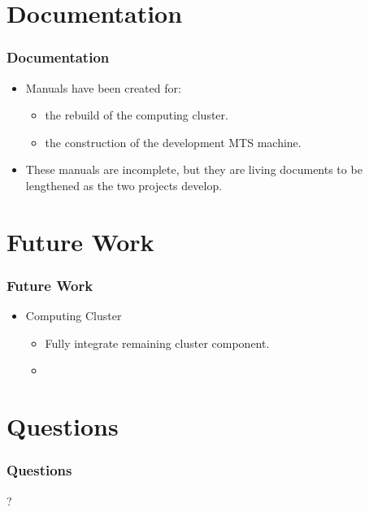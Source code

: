 \documentclass[aspectratio=169]{beamer}
\begin{document}


\section{Documentation}

\begin{frame}

  \frametitle{Documentation}

  \begin{itemize}
    \item Manuals have been created for:
      \begin{itemize}
        \item the rebuild of the computing cluster.
        \item the construction of the development MTS machine.
      \end{itemize}
    \item These manuals are incomplete, but they are living documents to be
      lengthened as the two projects develop.
  \end{itemize}


\end{frame}



\section{Future Work}

\begin{frame}

  \frametitle{Future Work}

  \begin{itemize}
    \item Computing Cluster
      \begin{itemize}
        \item Fully integrate remaining cluster component.
        \item 
      \end{itemize}
  \end{itemize}

\end{frame}



\section{Questions}

\begin{frame}

  \frametitle{Questions}

  \begin{center}
    {\fontsize{200}{200}\selectfont ?}
  \end{center}
  
\end{frame}

\end{document}
